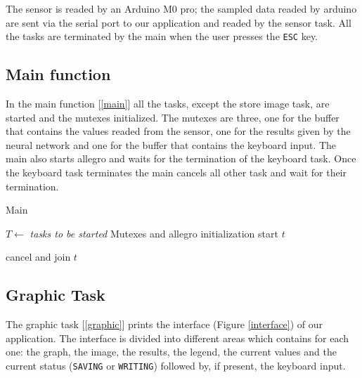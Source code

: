 \documentclass[12pt]{article}
\begin{document}
The sensor is readed by an Arduino M0 pro; the sampled data readed by arduino
are sent via the serial port to our application and readed by the sensor
task. All the tasks are terminated by the main when the user presses the
\texttt{ESC} key.

\subsection{Main function}
In the main function [\ref{main}] all the tasks, except the store image task,
are started and the mutexes initialized. The mutexes are three, one for the
buffer that contains the values readed from the sensor, one for the results
given by the neural network and one for the buffer that contains the keyboard
input. The main also starts allegro and waits for the termination of the
keyboard task. Once the keyboard task terminates the main cancels all other
task and wait for their termination.

\begin{algorithm}[b]
\caption{Main}
\label{main}

\begin{algorithmic}
\State $T\gets$ \textit{tasks to be started}
\State Mutexes and allegro initialization
    \State start $t$
\EndFor

\Repeat
{}

    \State cancel and join $t$
\EndFor

\end{algorithmic}
\end{algorithm}

\subsection{Graphic Task}

The graphic task [\ref{graphic}] prints the interface (Figure
\ref{interface}) of our application. The interface is divided into different
areas which contains for each one: the graph, the image, the results, the
legend, the current values and the current status (\texttt{SAVING} or
\texttt{WRITING}) followed by, if present, the keyboard input.
\end{document}
